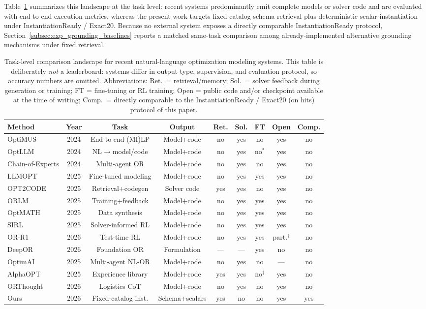 \documentclass[pdflatex,sn-basic,Numbered]{sn-jnl}
\begin{document}
Table~\ref{tab:comparison_landscape} summarizes this landscape at the task level: recent systems predominantly emit complete models or solver code and are evaluated with end-to-end execution metrics, whereas the present work targets fixed-catalog schema retrieval plus deterministic scalar instantiation under InstantiationReady / Exact20. Because no external system exposes a directly comparable InstantiationReady protocol, Section~\ref{subsec:exp_grounding_baselines} reports a matched same-task comparison among already-implemented alternative grounding mechanisms under fixed retrieval.

\begin{table}[t]
\centering
\caption{Task-level comparison landscape for recent natural-language optimization modeling systems.
This table is deliberately \emph{not} a leaderboard: systems differ in output type, supervision, and
evaluation protocol, so accuracy numbers are omitted. Abbreviations: Ret.\ = retrieval/memory;
Sol.\ = solver feedback during generation or training; FT = fine-tuning or RL training;
Open = public code and/or checkpoint available at the time of writing; Comp.\ = directly comparable
to the InstantiationReady / Exact20 (on hits) protocol of this paper.}
\label{tab:comparison_landscape}
\scriptsize
\setlength{\tabcolsep}{2.4pt}
\renewcommand{\arraystretch}{1.12}
\begin{tabular}{@{}lcccccccc@{}}
\toprule
Method & Year & Task & Output & Ret. & Sol. & FT & Open & Comp. \\
\midrule
OptiMUS & 2024 & End-to-end (MI)LP & Model+code & no & yes & no & yes & no \\
OptLLM & 2024 & NL$\rightarrow$model/code & Model+code & no & yes & no$^{*}$ & yes & no \\
Chain-of-Experts & 2024 & Multi-agent OR & Model+code & no & yes & no & yes & no \\
LLMOPT & 2025 & Fine-tuned modeling & Model+code & no & yes & yes & yes & no \\
OPT2CODE & 2025 & Retrieval+codegen & Solver code & yes & yes & no & yes & no \\
ORLM & 2025 & Training+feedback & Model+code & no & yes & yes & yes & no \\
OptMATH & 2025 & Data synthesis & Model+code & no & yes & yes & yes & no \\
SIRL & 2025 & Solver-informed RL & Model+code & no & yes & yes & yes & no \\
OR-R1 & 2026 & Test-time RL & Model+code & no & yes & yes & part.$^{\dagger}$ & no \\
DeepOR & 2026 & Foundation OR & Formulation & --- & --- & yes & no & no \\
OptimAI & 2025 & Multi-agent NL-OR & Model+code & no & yes & no & --- & no \\
AlphaOPT & 2025 & Experience library & Model+code & yes & yes & no$^{\ddagger}$ & yes & no \\
ORThought & 2026 & Logistics CoT & Model+code & no & yes & no & yes & no \\
Ours & 2026 & Fixed-catalog inst. & Schema+scalars & yes & no & no & yes & yes \\
\bottomrule
\end{tabular}


\end{table}
\end{document}
